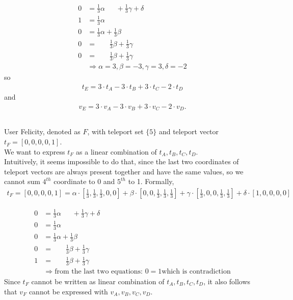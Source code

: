 \documentclass[a4paper,11pt]{article}
\begin{document}
\begin{align*}
0 &= \frac{1}{3} \alpha  \ \ \ \ \ \ \ + \frac{1}{3} \gamma + \delta
\\
1 &= \frac{1}{3}  \alpha 
\\
0 &= \frac{1}{3} \alpha + \frac{1}{3} \beta 
\\
0 &= \ \ \ \ \ \ \ \ \frac{1}{3} \beta + \frac{1}{3} \gamma 
\\
0 &= \ \ \ \ \ \ \ \ \frac{1}{3} \beta + \frac{1}{3}  \gamma 
\\
&\Rightarrow \alpha = 3, \beta = - 3, \gamma = 3, \delta = -2
\end{align*}
so 
\begin{align*}
t_E = 3 \cdot t_A -3 \cdot t_B + 3 \cdot t_C - 2 \cdot t_D
\end{align*}
and 
\begin{align*}
    v_E = 3 \cdot v_A -3 \cdot v_B + 3 \cdot v_C - 2 \cdot v_D.
\end{align*}

\subsection{}
User Felicity, denoted as $F$, with teleport set $\{5\}$ and teleport vector $t_F = [0, 0, 0, 0, 1]$.
\\
We want to express $t_F$ as a linear combination of $t_A, t_B, t_C, t_D$. 
\\
Intuitively, it seems impossible to do that, since the last two coordinates of teleport vectors are always present together and have the same values, so we cannot sum $4^{th}$ coordinate to 0 and $5^{th}$ to 1.
Formally,
\begin{align*}
    t_F = [0, 0, 0, 0, 1] = \alpha \cdot \left[\frac{1}{3}, \frac{1}{3}, \frac{1}{3}, 0, 0 \right] 
                            + \beta \cdot \left[0, 0, \frac{1}{3}, \frac{1}{3}, \frac{1}{3}\right]
                            + \gamma \cdot \left[\frac{1}{3}, 0, 0, \frac{1}{3}, \frac{1}{3}\right]
                            + \delta \cdot \left[1, 0, 0, 0, 0\right]
\end{align*}

\begin{align*}
        0 &= \frac{1}{3} \alpha  \ \ \ \ \ \ \ + \frac{1}{3} \gamma + \delta
        \\
        0 &= \frac{1}{3}  \alpha 
        \\
        0 &= \frac{1}{3} \alpha + \frac{1}{3} \beta 
        \\
        0 &= \ \ \ \ \ \ \ \ \frac{1}{3} \beta + \frac{1}{3} \gamma 
        \\
        1 &= \ \ \ \ \ \ \ \ \frac{1}{3} \beta + \frac{1}{3}  \gamma 
        \\
        &\Rightarrow \text{from the last two equations: } 0 = 1 \text{which is contradiction}
\end{align*}
\noindent
Since $t_F$ cannot be written as linear combination of $t_A, t_B, t_C, t_D$, it also follows that $v_F$ cannot be expressed with $v_A, v_B, v_C, v_D$.
\end{document}

